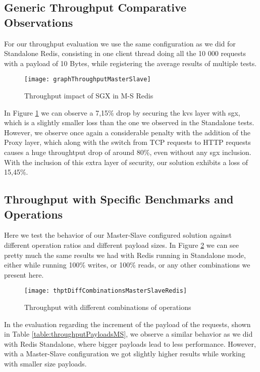 \subsection{Generic Throughput Comparative Observations}
For our throughput evaluation we use the same configuration as we did for Standalone Redis, consisting in one client thread doing all the 10 000 requests with a payload of 10 Bytes, while registering the average results of multiple tests.

\begin{figure}[htbp]
	\centering
	{\texttt{[image: graphThroughputMasterSlave]}}
	\caption{Throughput impact of SGX in M-S Redis}
	\label{fig:graphTroughputMasterSlave}
\end{figure}

In Figure \ref{fig:graphTroughputMasterSlave} we can observe a 7,15\% drop by securing the \gls{kvs} layer with \gls{sgx}, which is a slightly smaller loss than the one we observed in the Standalone tests. However, we observe once again a considerable penalty with the addition of the Proxy layer, which along with the switch from TCP requests to HTTP requests causes a huge throughtput drop of around 80\%, even without any \gls{sgx} inclusion. With the inclusion of this extra layer of security, our solution exhibits a loss of 15,45\%.



\subsection{Throughput with Specific Benchmarks and Operations}

Here we test the behavior of our Master-Slave configured solution against different operation ratios and different payload sizes. 
In Figure \ref{fig:thptDiffCombinationsMasterSlaveRedis} we can see pretty much the same results we had with Redis running in Standalone mode, either while running 100\% writes, or 100\% reads, or any other combinations we present here.  

\begin{figure}[htbp]
	\centering
	{\texttt{[image: thptDiffCombinationsMasterSlaveRedis]}}
	\caption{Throughput with different combinations of operations}
	\label{fig:thptDiffCombinationsMasterSlaveRedis}
\end{figure}

In the evaluation regarding the increment of the payload of the requests, shown in Table \ref{table:throughputPayloadsMS}, we observe a similar behavior as we did with Redis Standalone, where bigger payloads lead to less performance. However, with a Master-Slave configuration we got slightly higher results while working with smaller size payloads.

